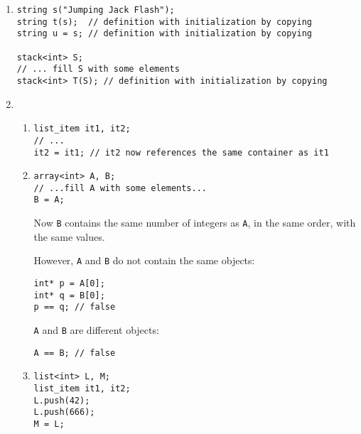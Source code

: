       \begin{enumerate}
 

        \item 
\begin{verbatim}string s("Jumping Jack Flash");
string t(s);  // definition with initialization by copying
string u = s; // definition with initialization by copying

stack<int> S;
// ... fill S with some elements
stack<int> T(S); // definition with initialization by copying
\end{verbatim}
        


        \item 

          \begin{enumerate}
 

            \item 
\begin{verbatim}list_item it1, it2;
// ...
it2 = it1; // it2 now references the same container as it1
\end{verbatim}


            \item 

\begin{verbatim}array<int> A, B;
// ...fill A with some elements...
B = A;
\end{verbatim}

              

 Now \verb$B$ contains the same number
              of integers as \verb$A$, in the same order,
              with the same values.

              

 However, \verb$A$ and \verb$B$ do not contain the same objects:

\begin{verbatim}int* p = A[0];
int* q = B[0];
p == q; // false

\end{verbatim}



              

 \verb$A$ and \verb$B$ are different objects:

\begin{verbatim}A == B; // false
\end{verbatim}




            \item 
\begin{verbatim}list<int> L, M;
list_item it1, it2;
L.push(42);
L.push(666);
M = L;
\end{verbatim}



\end{enumerate}
\end{enumerate}
